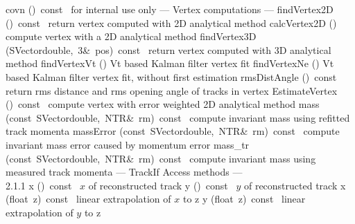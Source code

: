 \documentclass{article}
\begin{document}
\begin{cxxentry}
\begin{cxxclass}
\begin{cxxpublic}
        {}
\label{cxx.2.1.36}
        {covn}
        {()\ const\ }
        { for internal use only}
        {}
\label{cxx.2.1.37}
\cxxitem{}
        {--- Vertex computations --- }
        {}
        {}
        {}
\label{cxx.2.1.38}
        {findVertex2D}
        {()\ const\ }
        { return vertex computed with 2D analytical method}
        {}
\label{cxx.2.1.39}
        {calcVertex2D}
        {()}
        { compute vertex with a 2D analytical method}
        {}
\label{cxx.2.1.40}
        {findVertex3D}
        {(SVector\<double,\ 3\>\&\ pos)\ const\ }
        { return vertex computed with 3D analytical method}
        {}
\label{cxx.2.1.41}
        {findVertexVt}
        {()}
        { Vt based Kalman filter vertex fit}
        {}
\label{cxx.2.1.42}
        {findVertexNe}
        {()}
        { Vt based Kalman filter vertex fit, without first estimation}
        {}
\label{cxx.2.1.43}
        {rmsDistAngle}
        {()\ const\ }
        { return rms distance and rms opening angle of tracks in vertex}
        {}
\label{cxx.2.1.44}
        {EstimateVertex}
        {()\ const\ }
        { compute vertex with error weighted 2D analytical method}
        {}
\label{cxx.2.1.45}
        {mass}
        {(const\ SVector\<double,\ NTR\>\&\ rm)\ const\ }
        { compute invariant mass using refitted track momenta}
        {}
\label{cxx.2.1.46}
        {massError}
        {(const\ SVector\<double,\ NTR\>\&\ rm)\ const\ }
        { compute invariant mass error caused by momentum error}
        {}
\label{cxx.2.1.47}
        {mass\_tr}
        {(const\ SVector\<double,\ NTR\>\&\ rm)\ const\ }
        { compute invariant mass using measured track momenta}
        {}
\label{cxx.2.1.48}
\cxxitem{}
        {--- TrackIf Access methods ---\\}
        {}
        {}
        {2.1.1}
        {x}
        {()\ const\ }
        { $x$ of reconstructed track}
        {}
\label{cxx.2.1.49}
        {y}
        {()\ const\ }
        {  $y$ of reconstructed track}
        {}
\label{cxx.2.1.50}
        {x}
        {(float\ z)\ const\ }
        { linear extrapolation of $x$ to z}
        {}
\label{cxx.2.1.51}
        {y}
        {(float\ z)\ const\ }
        { linear extrapolation of $y$ to z}
        {}

\end{cxxpublic}
\end{cxxclass}
\end{cxxentry}
\end{document}
